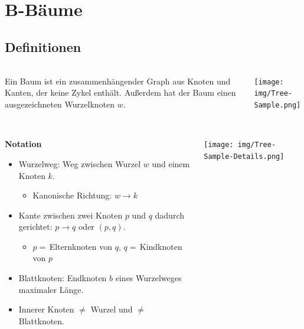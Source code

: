 \section{B-Bäume}
\subsection{Definitionen}

\begin{frame}{\insertsection}
\framesubtitle{\insertsubsection}
\begin{columns}[T]
	\begin{column}{.6\textwidth}
		\begin{definition}[Baum]
			Ein Baum ist ein zusammenh\"angender Graph aus Knoten und Kanten, der keine Zykel enth\"alt. 
			Au\ss erdem hat der Baum einen ausgezeichneten Wurzelknoten $w$. 
		\end{definition}
	\end{column}
	\begin{column}{.3\textwidth}
		\texttt{[image: img/Tree-Sample.png]}
	\end{column}
\end{columns}
\end{frame}

\begin{frame}{\insertsection}
\framesubtitle{\insertsubsection}
\begin{columns}
\begin{column}{.6\textwidth}
	\begin{block}{\textbf{Notation}}
		\begin{itemize}
			\item Wurzelweg: Weg zwischen Wurzel $w$ und einem Knoten $k$. 
			\begin{itemize}
				\item \normalsize{Kanonische Richtung: $w\rightarrow k$}
			\end{itemize}
			\item Kante zwischen zwei Knoten $p$ und $q$ dadurch gerichtet: $p\rightarrow q$ oder $(p,q)$.
			\begin{itemize}
				\item \normalsize{$p =\,$Elternknoten von $q$, $q =\,$Kindknoten von $p$}
			\end{itemize}		
			\item Blattknoten: Endknoten $b$ eines Wurzelweges maximaler L\"ange.		
			\item Innerer Knoten $\ne$ Wurzel und $\ne$ Blattknoten.
		\end{itemize}
	\end{block}
\end{column}
\begin{column}{.3\textwidth}
	\texttt{[image: img/Tree-Sample-Details.png]}
\end{column}
\end{columns}
\end{frame}

